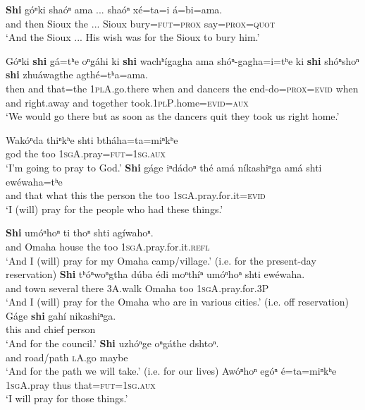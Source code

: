 \documentclass[output=paper]{LSP/langsci}
\begin{document}
\ex 
\gll  \textbf{Shi}  g\'oⁿki 	sha\'oⁿ 	ama ... sha\'oⁿ  	x\'e=ta=i  \'a=bi=ama.\\          
    	and  	then 	Sioux 	the 	 ... Sioux  	bury=\textsc{fut=prox} 	say=\textsc{prox=quot}\\
\trans `And the Sioux ...  His wish was for the Sioux to bury him.'

\ex 
\gll  G\'oⁿki 	\textbf{shi} 	g\'a=tʰe  oⁿg\'ahi  ki    \textbf{shi} 	wachʰ\'igagha ama  sh\'oⁿ-gagha=i=tʰe 	ki 	\textbf{shi} 	sh\'oⁿshoⁿ    \textbf{shi} 	zhu\'awagthe 	agth\'e=tʰa=ama.\\
    	then 	and that=the \textsc{1plA}.go.there when 	and dancers the end-do=\textsc{prox=evid} when 	and right.away and 	together 	took.\textsc{1plP}.home=\textsc{evid=aux}\\
\trans `We would go there but as soon as the dancers quit they took us right home.'
\z 

\ea
\ea
\gll  Wak\'oⁿda 	thiⁿkʰe 	shti  	bth\'aha=ta=miⁿkʰe\\
	god          	the       	too  	\textsc{1sgA}.pray=\textsc{fut=1sg.aux}\\
\trans `I'm going to pray to God.'
\ex
\gll	\textbf{Shi} g\'age 	iⁿd\'adoⁿ th\'e 	am\'a 	n\'ikashiⁿga 	am\'a 	shti ew\'ewaha=tʰe\\
and 	that   what     	this 	the 	person    	the 	too 	\textsc{1sgA}.pray.for.it=\textsc{evid}\\
\trans `I (will) pray for the people who had these things.'

\ex
\gll	\textbf{Shi}  um\'oⁿhoⁿ 	ti    	thoⁿ 	shti 	ag\'iwahoⁿ.\\
and 	Omaha  	house 	the 	too 	\textsc{1sgA}.pray.for.it.\textsc{refl}\\
\trans `And I (will) pray for my Omaha camp/village.'  (i.e. for the present-day reservation)
\ex
\gll	\textbf{Shi} tʰ\'oⁿwoⁿgtha d\'uba  \'edi moⁿth\'iⁿ um\'oⁿhoⁿ shti ew\'ewaha. \\         
and town several there 3A.walk Omaha  	too 	\textsc{1sgA}.pray.for.3P\\
\trans `And I (will) pray for the Omaha who are in various cities.'  (i.e. off reservation)
\ex
\gll	G\'age \textbf{shi} 	gah\'i 	nikashiⁿga.\\
	this 	and 	chief  	person\\
\trans `And for the council.'
\ex
\gll	\textbf{Shi} uzh\'oⁿge  	oⁿg\'athe 	dshtoⁿ.\\
	and  	road/path 	\textsc{lA}.go  	maybe\\
\trans `And for the path we will take.'  (i.e. for our lives)
\ex
\gll	Aw\'oⁿhoⁿ 	eg\'oⁿ  	\'e=ta=miⁿkʰe\\
	\textsc{1sgA}.pray 	thus 	that=\textsc{fut=1sg.aux}\\
\trans `I will pray for those things.' 
\z
\z
\end{document}
